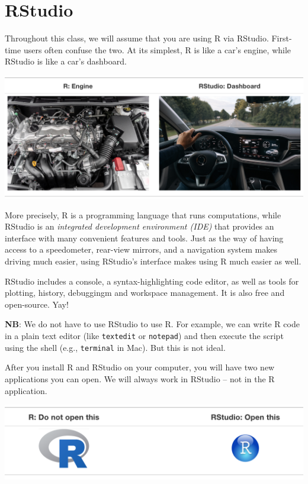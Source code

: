 \documentclass[
]{book}
\begin{document}
\hypertarget{rstudio-1}{%
\section{RStudio}\label{rstudio-1}}

Throughout this class, we will assume that you are using R via RStudio. First-time users often confuse the two. At its simplest, R is like a car's engine, while RStudio is like a car's dashboard.

\begin{center}\includegraphics[width=0.7\linewidth]{img/R_vs_RStudio_1} \end{center}

More precisely, R is a programming language that runs computations, while RStudio is an \emph{integrated development environment (IDE)} that provides an interface with many convenient features and tools. Just as the way of having access to a speedometer, rear-view mirrors, and a navigation system makes driving much easier, using RStudio's interface makes using R much easier as well.

RStudio includes a console, a syntax-highlighting code editor, as well as tools for plotting, history, debuggingm and workspace management. It is also free and open-source. Yay!

\textbf{NB}: We do not have to use RStudio to use R. For example, we can write R code in a plain text editor (like \texttt{textedit} or \texttt{notepad}) and then execute the script using the shell (e.g., \texttt{terminal} in Mac). But this is not ideal.

After you install R and RStudio on your computer, you will have two new applications you can open. We will always work in RStudio -- not in the R application.

\begin{center}\includegraphics[width=0.7\linewidth]{img/R_vs_RStudio} \end{center}
\end{document}
